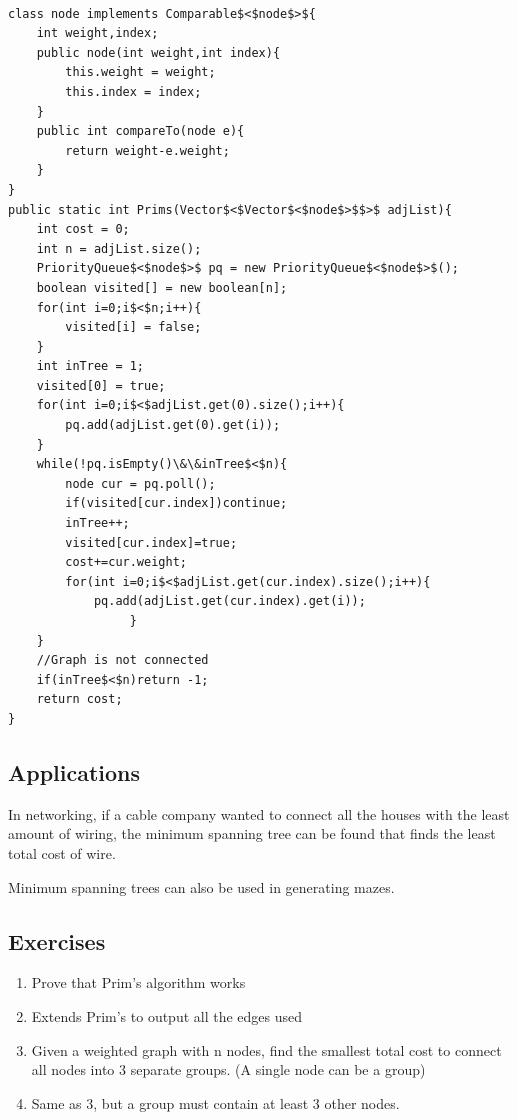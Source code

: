 \documentclass[11pt,oneside]{book}
\begin{document}
\begin{lstlisting}

class node implements Comparable$<$node$>${
    int weight,index;
    public node(int weight,int index){
        this.weight = weight;
        this.index = index;
    }
    public int compareTo(node e){
        return weight-e.weight;
    }
}
public static int Prims(Vector$<$Vector$<$node$>$$>$ adjList){
    int cost = 0;
    int n = adjList.size();
    PriorityQueue$<$node$>$ pq = new PriorityQueue$<$node$>$();
    boolean visited[] = new boolean[n];
    for(int i=0;i$<$n;i++){
        visited[i] = false;
    }
    int inTree = 1;
    visited[0] = true;
    for(int i=0;i$<$adjList.get(0).size();i++){
        pq.add(adjList.get(0).get(i));
    }
    while(!pq.isEmpty()\&\&inTree$<$n){
        node cur = pq.poll();
        if(visited[cur.index])continue;
        inTree++;
        visited[cur.index]=true;
        cost+=cur.weight;
        for(int i=0;i$<$adjList.get(cur.index).size();i++){
            pq.add(adjList.get(cur.index).get(i));          
                 }
    }
    //Graph is not connected
    if(inTree$<$n)return -1;
    return cost;
}
\end{lstlisting}

\subsection{Applications}

In networking, if a cable company wanted to connect all the houses with the least amount of wiring, the minimum spanning tree can be found that finds the least total cost of wire.

Minimum spanning trees can also be used in generating mazes.

\subsection{Exercises}

\begin{enumerate}
\item Prove that Prim's algorithm works
\item Extends Prim's to output all the edges used
\item Given a weighted graph with n nodes, find the smallest total cost to connect all nodes into 3 separate groups. (A single node can be a group)
\item Same as 3, but a group must contain at least 3 other nodes.
\end{enumerate}
\end{document}
